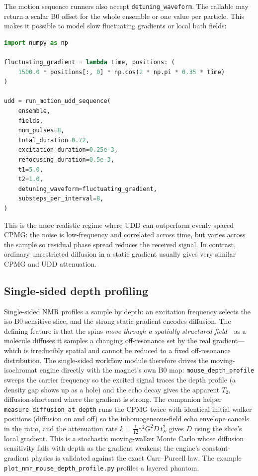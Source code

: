 \documentclass[11pt,oneside]{report}
\newcommand{\code}[1]{\texttt{#1}}
\begin{document}
The motion sequence runners also accept \code{detuning\_waveform}. The callable
may return a scalar B0 offset for the whole ensemble or one value per particle.
This makes it possible to model slow fluctuating gradients or local bath fields:

\begin{lstlisting}[language=Python]
import numpy as np

fluctuating_gradient = lambda time, positions: (
    1500.0 * positions[:, 0] * np.cos(2 * np.pi * 0.35 * time)
)

udd = run_motion_udd_sequence(
    ensemble,
    fields,
    num_pulses=8,
    total_duration=0.72,
    excitation_duration=0.25e-3,
    refocusing_duration=0.5e-3,
    t1=5.0,
    t2=1.0,
    detuning_waveform=fluctuating_gradient,
    substeps_per_interval=8,
)
\end{lstlisting}

This is the more realistic regime where UDD can outperform evenly spaced CPMG:
the noise is low-frequency and correlated across time, but varies across the
sample so residual phase spread reduces the received signal. In contrast,
ordinary unrestricted diffusion in a static gradient usually gives very similar
CPMG and UDD attenuation.

\subsection{Single-sided depth profiling}
\label{sec:single-sided-nmr}

Single-sided NMR profiles a sample by depth: an excitation frequency selects the
iso-B0 sensitive slice, and the strong static gradient encodes diffusion. The
defining feature is that the spins \emph{move through a spatially structured
field}---as a molecule diffuses it samples a changing off-resonance set by the
real gradient---which is irreducibly spatial and cannot be reduced to a fixed
off-resonance distribution. The single-sided workflow module therefore drives
the moving-isochromat engine directly with the magnet's own B0 map:
\code{mouse\_depth\_profile} sweeps the carrier frequency so the excited signal
traces the depth profile (a density gap shows up as a hole) and the echo decay
gives the apparent \(T_2\), diffusion-shortened where the gradient is strong.
The companion helper \code{measure\_diffusion\_\allowbreak at\_depth} runs the
CPMG twice with identical initial walker positions (diffusion on and off) so the
inhomogeneous-field echo envelope cancels in the ratio, and the attenuation rate
\(k=\tfrac{1}{12}\gamma^2 G^2 D\,t_E^2\) gives \(D\) using the slice's local
gradient. This is a stochastic moving-walker Monte Carlo whose diffusion
sensitivity falls with depth as the gradient weakens; the engine's
constant-gradient physics is validated against the exact Carr--Purcell law.
The example \code{plot\_nmr\_mouse\_depth\_profile.py} profiles a layered phantom.
\end{document}
